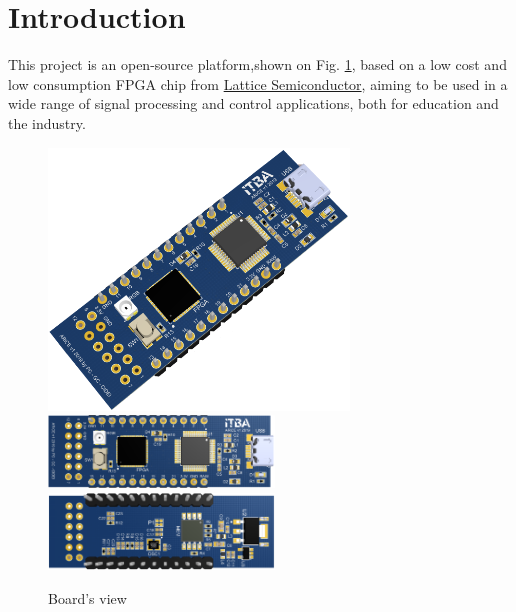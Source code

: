 \documentclass[11pt, a4paper, oneside]{article}
\begin{document}
\tableofcontents
\newpage

\section{Introduction}
This project is an open-source platform,shown on Fig. \ref{fig1},  based on a low cost and low consumption FPGA chip from \href{http://www.latticesemi.com}{Lattice Semiconductor}, aiming to be used in a wide range of signal processing and control applications, both for education and the industry.
%
\begin{figure}[h!]
	\centering
	\includegraphics[width=8cm]{figs/fig1a.png}\\
	\includegraphics[width=6cm]{figs/fig1b.png}%
	\includegraphics[width=6cm]{figs/fig1c.png}
	\caption{Board's view}
	\label{fig1}
\end{figure}

\end{document}

